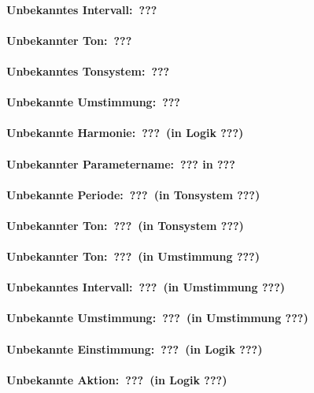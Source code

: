 \paragraph{Unbekanntes Intervall:\ ???}
\paragraph{Unbekannter Ton:\ ???}
\paragraph{Unbekanntes Tonsystem:\ ???}
\paragraph{Unbekannte Umstimmung:\ ???}
\paragraph{Unbekannte Harmonie:\ ???\ (in Logik ???)}
\paragraph{Unbekannter Parametername:\ ??? in ???}
\paragraph{Unbekannte Periode:\ ???\ (in Tonsystem ???)}
\paragraph{Unbekannter Ton:\ ???\ (in Tonsystem ???)}
\paragraph{Unbekannter Ton:\ ???\ (in Umstimmung ???)}
\paragraph{Unbekanntes Intervall:\ ???\ (in Umstimmung ???)}
\paragraph{Unbekannte Umstimmung:\ ???\ (in Umstimmung ???)}
\paragraph{Unbekannte Einstimmung:\ ???\ (in Logik ???)}
\paragraph{Unbekannte Aktion:\ ???\ (in Logik ???)}
	 
